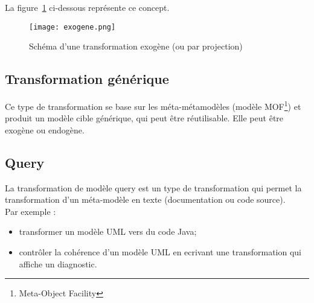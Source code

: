 \noindent La figure~\ref{projection} ci-dessous repr{\'e}sente ce concept.

\begin{figure}[!ht]
	\centering
	\texttt{[image: exogene.png]}
	\caption{Sch{\'e}ma d'une transformation exog{\`e}ne (ou par projection)}
	\label{projection}

\end{figure}

\subsection{Transformation g{\'e}n{\'e}rique}
Ce type de transformation se base sur les m{\'e}ta-m{\'e}tamod{\`e}les (mod{\`e}le MOF\protect\footnote{Meta-Object Facility}) et produit un mod{\`e}le cible g{\'e}n{\'e}rique, qui peut {\^e}tre r{\'e}utilisable. Elle peut {\^e}tre exog{\`e}ne ou endog{\`e}ne.

\subsection{Query}
La transformation de mod{\`e}le query est un type de transformation qui permet la transformation d'un m{\'e}ta-mod{\`e}le en texte (documentation ou code source).\\
Par exemple :
\begin{itemize}
\item transformer un mod{\`e}le UML vers du code Java;
\item contr{\^o}ler la coh{\'e}rence d'un mod{\`e}le UML en ecrivant une transformation qui affiche un diagnostic.
\end{itemize}
